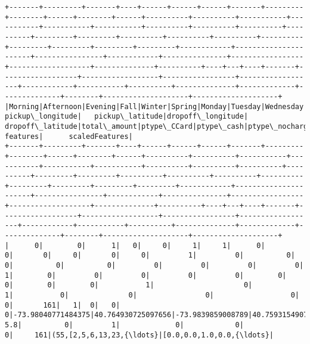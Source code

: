 \documentclass[11pt]{article}
\begin{document}
    \begin{Verbatim}[commandchars=\\\{\}]
+-------+---------+-------+----+------+------+------+-------+---------+--------+------+--------+------+----------+----------+-----------+-----------+-----------+-----------+----------+----------+----------+----------+---------+---------+----------+----------+----------+----------+---------+---------+---------+---------+------------+----------------------+----------------+------------+---------------+-----------------+-------------------+--------------+----------+----+---+----+-------+------------------+------------------+-----------------+------------------+------------+-----------+----------+--------------+-------------+--------------+--------+--------------------+--------------------+
|Morning|Afternoon|Evening|Fall|Winter|Spring|Monday|Tuesday|Wednesday|Thursday|Friday|Saturday|Sunday|dropoff\_cc|dropoff\_GM|dropoff\_ues|dropoff\_Gvs|dropoff\_Uws|dropoff\_Les|dropoff\_Lm|dropoff\_Wq|dropoff\_Nb|dropoff\_ch|Pickup\_cc|Pickup\_GM|Pickup\_ues|Pickup\_Gvs|Pickup\_Uws|Pickup\_Les|Pickup\_Lm|Pickup\_Wq|Pickup\_Nb|Pickup\_Nq|VendorID\_1\_0|store\_and\_fwd\_flag\_1\_0|RateCode\_stdrate|RateCode\_JFK|RateCode\_Newark|RateCode\_Nassau\_W|RateCode\_Negotiated|RateCode\_Group|avg\_temp\_C|Rain|Fog|Snow|Holiday|  pickup\_longitude|   pickup\_latitude|dropoff\_longitude|  dropoff\_latitude|total\_amount|ptype\_CCard|ptype\_cash|ptype\_nocharge|ptype\_dispute|ptype\_voidtrip|Duration|            features|      scaledFeatures|
+-------+---------+-------+----+------+------+------+-------+---------+--------+------+--------+------+----------+----------+-----------+-----------+-----------+-----------+----------+----------+----------+----------+---------+---------+----------+----------+----------+----------+---------+---------+---------+---------+------------+----------------------+----------------+------------+---------------+-----------------+-------------------+--------------+----------+----+---+----+-------+------------------+------------------+-----------------+------------------+------------+-----------+----------+--------------+-------------+--------------+--------+--------------------+--------------------+
|      0|        0|      1|   0|     0|     1|     1|      0|        0|       0|     0|       0|     0|         1|         0|          0|          0|          0|          0|         0|         0|         0|         0|        1|        0|         0|         0|         0|         0|        0|        0|        0|        0|           1|                     0|               1|           0|              0|                0|                  0|             0|       161|   1|  0|   0|      0|-73.98040771484375|40.764930725097656|-73.9839859008789|40.759315490722656|         5.8|          0|         1|             0|            0|             0|     161|(55,[2,5,6,13,23,{\ldots}|[0.0,0.0,1.0,0.0,{\ldots}|

\end{Verbatim}
\end{document}
